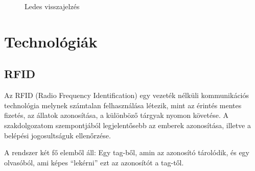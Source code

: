 \documentclass[
]{thesis-ekf}
\theoremstyle{definition}
\theoremstyle{remark}
\begin{document}
\begin{figure}[ht]
    \centering
    \qquad
    \caption{Ledes visszajelzés}%
    \label{fig:example}%
\end{figure}

\section{Technológiák}
\subsection{RFID}
Az RFID (Radio Frequency Identification) egy vezeték nélküli kommunikációs technológia melynek számtalan felhasználása létezik, mint az érintés mentes fizetés, az állatok azonosítása, a különböző tárgyak nyomon követése. A szakdolgozatom szempontjából legjelentősebb az emberek azonosítása, illetve a belépési jogosultságuk ellenőrzése. \cite{RFID-types}

A rendszer két fő elemből áll: Egy tag-ből, amin az azonosító tárolódik, és egy olvasóból, ami képes \enquote{lekérni} ezt az azonosítót a tag-től.
\end{document}
